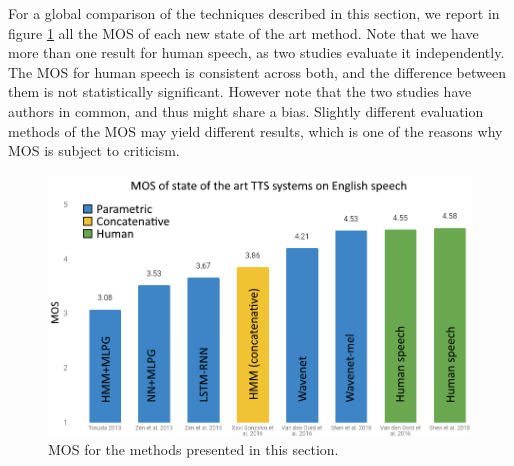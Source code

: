 \documentclass[a4paper, oneside, 12pt, english]{article}
\begin{document}
For a global comparison of the techniques described in this section, we report in figure \ref{mos_all} all the MOS of each new state of the art method. Note that we have more than one result for human speech, as two studies evaluate it independently. The MOS for human speech is consistent across both, and the difference between them is not statistically significant. However note that the two studies have authors in common, and thus might share a bias. Slightly different evaluation methods of the MOS may yield different results, which is one of the reasons why MOS is subject to criticism.

\begin{figure}[h]
	\centering
	\includegraphics[width=0.8\linewidth]{images/mos_all.png}
	\caption{MOS for the methods presented in this section.}
	\label{mos_all}
\end{figure}


\end{document}
